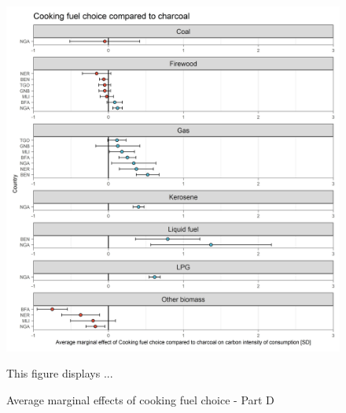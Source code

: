 \documentclass[12pt, a4paper]{article}
\newenvironment{subcaption}
{\strut
\vspace{-5pt}
\begin{minipage}[b]{0.9\textwidth}
  \hspace*{-\parindent}
  \footnotesize}
 {\end{minipage}}
\begin{document}
\begin{figure}[ht!]
  \centering
 \caption{Average marginal effects of cooking fuel choice - Part D} \label{fig:E9_Charcoal}
  \includegraphics{Analysis_OLS_ME_Carbon_Intensity/AME_OLS_CI_CI_Charcoal}
  \begin{subcaption}
    This figure displays ...
  \end{subcaption}

\end{figure}

\clearpage
\end{document}

